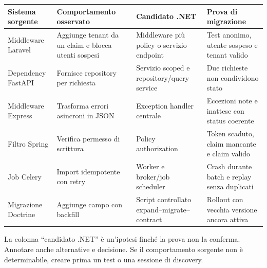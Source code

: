 \documentclass[
  italian,
  10pt,
]{book}
\newcounter{none} %
\begin{document}
{\def\LTcaptype{none} %
\begin{longtable}[]{@{}
  >{\raggedright\arraybackslash}p{}
  >{\raggedright\arraybackslash}p{}
  >{\raggedright\arraybackslash}p{}
  >{\raggedright\arraybackslash}p{}@{}}
\toprule\noalign{}
\begin{minipage}[b]{\linewidth}\raggedright
Sistema sorgente
\end{minipage} & \begin{minipage}[b]{\linewidth}\raggedright
Comportamento osservato
\end{minipage} & \begin{minipage}[b]{\linewidth}\raggedright
Candidato .NET
\end{minipage} & \begin{minipage}[b]{\linewidth}\raggedright
Prova di migrazione
\end{minipage} \\
\midrule\noalign{}
\endhead
\bottomrule\noalign{}
\endlastfoot
Middleware Laravel & Aggiunge tenant da un claim e blocca utenti sospesi
& Middleware più policy o servizio endpoint & Test anonimo, utente
sospeso e tenant valido \\
Dependency FastAPI & Fornisce repository per richiesta & Servizio scoped
e repository/query service & Due richieste non condividono stato \\
Middleware Express & Trasforma errori asincroni in JSON & Exception
handler centrale & Eccezioni note e inattese con status coerente \\
Filtro Spring & Verifica permesso di scrittura & Policy authorization &
Token scaduto, claim mancante e claim valido \\
Job Celery & Import idempotente con retry & Worker e broker/job
scheduler & Crash durante batch e replay senza duplicati \\
Migrazione Doctrine & Aggiunge campo con backfill & Script controllato
expand--migrate--contract & Rollout con vecchia versione ancora
attiva \\
\end{longtable}
}

La colonna ``candidato .NET'' è un'ipotesi finché la prova non la
conferma. Annotare anche alternative e decisione. Se il comportamento
sorgente non è determinabile, creare prima un test o una sessione di
discovery.
\end{document}
